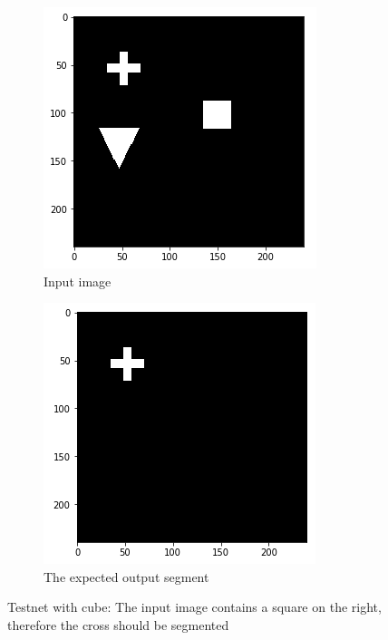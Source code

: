 \begin{figure}[H]
    \centering
    \begin{subfigure}[t]{.5\textwidth}
        \centering
        \includegraphics[width=\linewidth]{chapters/05_testnet/images/testnet_b-0.png}
        \caption{Input image}
    \end{subfigure}%
    \begin{subfigure}[t]{.5\textwidth}
        \centering
        \includegraphics[width=\linewidth]{chapters/05_testnet/images/testnet_b-1.png}
        \caption{The expected output segment}
    \end{subfigure}
    \caption{Testnet with cube: The input image contains a square on the right, therefore the cross should be segmented}
    \label{testnet_example_2}
\end{figure}

